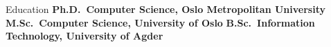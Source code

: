 \begin{rubric}{Education}
\entry*[2018 -- 2022]%
	\textbf{Ph.D.~Computer Science, Oslo Metropolitan University}
%
\entry*[2016 -- 2018]%
	\textbf{M.Sc.~Computer Science, University of Oslo}
% 
\entry*[2012 -- 2015]%
	\textbf{B.Sc.~Information Technology, University of Agder}
\end{rubric}